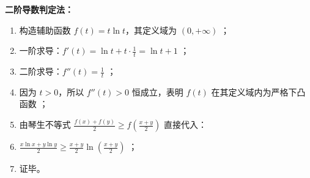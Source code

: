 \begin{proofbox}
\textbf{二阶导数判定法：}
\begin{enumerate}
    \item 构造辅助函数 $f(t) = t\ln t$，其定义域为 $(0, +\infty)$ ；
    \item 一阶求导：$f'(t) = \ln t + t \cdot \frac{1}{t} = \ln t + 1$ ；
    \item 二阶求导：$f''(t) = \frac{1}{t}$ ；
    \item 因为 $t > 0$，所以 $f''(t) > 0$ 恒成立，表明 $f(t)$ 在其定义域内为严格下凸函数 ；
    \item 由琴生不等式 $\frac{f(x)+f(y)}{2} \geqslant f\left(\frac{x+y}{2}\right)$ 直接代入：
    \item $\frac{x\ln x + y\ln y}{2} \geqslant \frac{x+y}{2}\ln\left(\frac{x+y}{2}\right)$ ；
    \item 证毕。
\end{enumerate}
\end{proofbox}